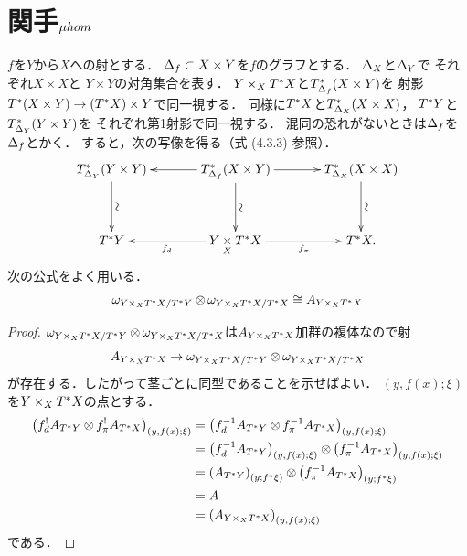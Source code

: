 \section{関手\(\muhom\)}
\(f\)を\(Y\)から\(X\)への射とする．
\(\diag[f]\subset X\times Y\)を\(f\)のグラフとする．
\(\diag[X]\)と\(\diag[Y]\)で
それぞれ\(X\times X\)と
\(Y\times Y\)の対角集合を表す．
\(Y\mathbin{\times_{X}}\cotb[X]\)と\(T^{\ast}_{\diag[f]}(X\times Y)\)を
射影\(\cotb[(X\times Y)]\to(\cotb[X])\times Y\)で同一視する．
同様に\(\cotb[X]\)と\(T^{\ast}_{\diag[X]}(X\times X)\)，
\(\cotb[Y]\)と\(T^{\ast}_{\diag[Y]}(Y\times Y)\)を
それぞれ第1射影で同一視する．
混同の恐れがないときは\(\diag[f]\)を\(\diag[f]\)とかく．
すると，次の写像を得る（式 (4.3.3) 参照）．
\begin{equation}\label{eq:4.4.1}
  \vcenter{\xymatrix@C=36pt@R=36pt{
    T^{\ast}_{\diag[Y]}(Y\times Y)
    \ar[d]^-{\rotatebox{90}{\(\sim\)}}
    &
    T^{\ast}_{\diag[f]}(X\times Y)
    \ar[d]^-{\rotatebox{90}{\(\sim\)}}
    \ar[l]
    \ar[r]
    &
    T^{\ast}_{\diag[X]}(X\times X)
    \ar[d]^-{\rotatebox{90}{\(\sim\)}}
    \\
    \cotb[Y]
    &
    Y\pb[X]\cotb[X]
    \ar[l]^-{\mdiff[f]}
    \ar[r]_-{\mpb[f]}
    &
    \cotb[X].
  }}
\end{equation}
次の公式をよく用いる．
\begin{equation}\label{eq:4.4.2}
  \omega_{{Y\mathbin{\times_{X}}\cotb[X]}\mathbin{/}\cotb[Y]}
  \tens[]
  \omega_{{Y\mathbin{\times_{X}}\cotb[X]}\mathbin{/}\cotb[X]}
  \cong
  A_{Y\mathbin{\times_{X}}\cotb[X]}
\end{equation}
\begin{proof}
  \(
    \omega_{{Y\mathbin{\times_{X}}\cotb[X]}\mathbin{/}\cotb[Y]}
    \tens[]
    \omega_{{Y\mathbin{\times_{X}}\cotb[X]}\mathbin{/}\cotb[X]}
  \)は\(A_{Y\mathbin{\times_{X}}\cotb[X]}\)加群の複体なので射
  \[
    A_{Y\mathbin{\times_{X}}\cotb[X]}
    \to
    \omega_{{Y\mathbin{\times_{X}}\cotb[X]}\mathbin{/}\cotb[Y]}
    \tens[]
    \omega_{{Y\mathbin{\times_{X}}\cotb[X]}\mathbin{/}\cotb[X]}
  \]
  が存在する．したがって茎ごとに同型であることを示せばよい．
  \((y,f(x);\xi)\)を\(Y\mathbin{\times_{X}}\cotb[X]\)の点とする．
  \begin{align*}
    \left(
      \mdiff[f]^{!}A_{\cotb[Y]}\tens[]\mpb[f]^{!}A_{\cotb[X]}
    \right)_{(y,f(x);\xi)}
    &=\left(
      \mdiff[f]^{-1}A_{\cotb[Y]}\tens[]\mpb[f]^{-1}A_{\cotb[X]}
    \right)_{(y,f(x);\xi)}\\
    &=\left(\mdiff[f]^{-1}A_{\cotb[Y]}\right)_{(y,f(x);\xi)}
    \tens[]\left(\mpb[f]^{-1}A_{\cotb[X]}
    \right)_{(y,f(x);\xi)}\\
    &=\left(A_{\cotb[Y]}\right)_{(y;f^{\ast}\xi)}
    \tens[]\left(\mpb[f]^{-1}A_{\cotb[X]}
    \right)_{(y;f^{\ast}\xi)}\\
    &=A\\
    &=\left(A_{Y\mathbin{\times_{X}}\cotb[X]}\right)_{(y,f(x);\xi)}
  \end{align*}
  である．
\end{proof}
